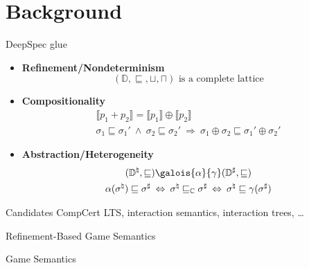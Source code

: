 \documentclass{beamer}
\begin{document}
\section{Background}

\begin{frame}{DeepSpec glue} %
\end{frame}

\begin{frame} %
\begin{center}
\end{center}
\begin{itemize}
\item \textbf{Refinement/Nondeterminism}
  \[ (\mathbb{D}, {\sqsubseteq}, {\sqcup}, {\sqcap})
     \mbox{ is a complete lattice} \]
\item \textbf{Compositionality}
  \begin{gather*}
    \llbracket p_1 + p_2 \rrbracket =
    \llbracket p_1 \rrbracket \oplus \llbracket p_2 \rrbracket
    \\
    \sigma_1 \sqsubseteq \sigma_1' \:\wedge\:
    \sigma_2 \sqsubseteq \sigma_2' \:\Rightarrow\:
    \sigma_1 \oplus \sigma_2 \sqsubseteq \sigma_1' \oplus \sigma_2'
  \end{gather*}
\item \textbf{Abstraction/Heterogeneity}
  \begin{gather*}
    (\mathbb{D}^\natural, {\sqsubseteq})
    \galois{\alpha}{\gamma}
    (\mathbb{D}^\sharp, {\sqsubseteq})
    \\
    \alpha(\sigma^\natural) \sqsubseteq \sigma^\sharp
    \: \Leftrightarrow \:
    \sigma^\natural \sqsubseteq_\mathbb{C} \sigma^\sharp
    \: \Leftrightarrow \:
    \sigma^\natural \sqsubseteq \gamma(\sigma^\sharp)
  \end{gather*}
\end{itemize}
\end{frame}

\begin{frame}{Candidates} %
CompCert LTS, interaction semantics, interaction trees, \ldots

Refinement-Based Game Semantics
\end{frame}

\begin{frame}{Game Semantics} %
\end{frame}
\end{document}
